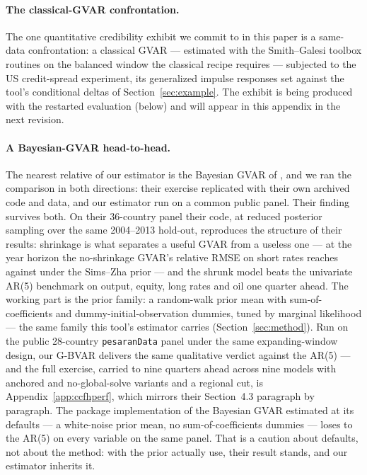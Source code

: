 \documentclass[11pt]{article}
\begin{document}
\paragraph{The classical-GVAR confrontation.} The one quantitative credibility exhibit we
commit to in this paper is a same-data confrontation: a classical GVAR --- estimated with
the Smith--Galesi toolbox routines \citep{SmithGalesi2014} on the balanced window the
classical recipe requires --- subjected to the US credit-spread experiment, its generalized
impulse responses \citep{PesaranShin1998} set against the tool's conditional deltas of
Section~\ref{sec:example}. The exhibit is being produced with the restarted evaluation
(below) and will appear in this appendix in the next revision.

\paragraph{A Bayesian-GVAR head-to-head.} The nearest relative of our estimator is the
Bayesian GVAR of \citet{CrespoFeldkircherHuber2016}, and we ran the comparison in both
directions: their exercise replicated with their own archived code and data, and our
estimator run on a common public panel. Their finding survives both. On their 36-country
panel their code, at reduced posterior sampling over the same 2004--2013 hold-out,
reproduces the structure of their results: shrinkage is what separates a useful GVAR from
a useless one --- at the year horizon the no-shrinkage GVAR's relative RMSE on short rates
reaches \CcfhDiffuseStirHFour{} against \CcfhSzStirHFour{} under the Sims--Zha prior ---
and the shrunk model beats the univariate AR(5) benchmark on output, equity, long rates
and oil one quarter ahead. The working part is the prior family: a random-walk prior mean
with sum-of-coefficients and dummy-initial-observation dummies, tuned by marginal
likelihood --- the same family this tool's estimator carries
(Section~\ref{sec:method}). Run on the public 28-country \texttt{pesaranData} panel under
the same expanding-window design, our G-BVAR delivers the same qualitative verdict against
the AR(5) --- and the full exercise, carried to nine quarters ahead across nine models
with anchored and no-global-solve variants and a regional cut, is
Appendix~\ref{app:ccfhperf}, which mirrors their Section~4.3 paragraph by paragraph. The
package implementation of the Bayesian GVAR estimated at its
defaults --- a white-noise prior mean, no sum-of-coefficients dummies --- loses to the
AR(5) on every variable on the same panel. That is a caution about defaults, not about the
method: with the prior \citeauthor{CrespoFeldkircherHuber2016} actually use, their result
stands, and our estimator inherits it.
\end{document}
